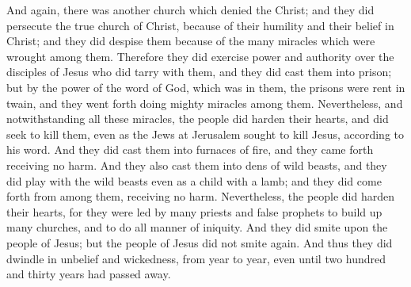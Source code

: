 And again, there was another church which denied the Christ; and they did persecute the true church of Christ, because of their humility and their belief in Christ; and they did despise them because of the many miracles which were wrought among them.
\bverse \iffalse Therefore they did exercise power and authority over the disciples of Jesus who did tarry with them, and they did cast them into prison; but by the power of the word of God, which was in them, the prisons were rent in twain, and they went forth doing mighty miracles among them. \fi
Therefore they did exercise power and authority over the disciples of Jesus who did tarry with them, and they did cast them into prison; but by the power of the word of God, which was in them, the prisons were rent in twain, and they went forth doing mighty miracles among them.
\bverse \iffalse Nevertheless, and notwithstanding all these miracles, the people did harden their hearts, and did seek to kill them, even as the Jews at Jerusalem sought to kill Jesus, according to his word. \fi
Nevertheless, and notwithstanding all these miracles, the people did harden their hearts, and did seek to kill them, even as the Jews at Jerusalem sought to kill Jesus, according to his word.
\bverse \iffalse And they did cast them into furnaces of fire, and they came forth receiving no harm. \fi
And they did cast them into furnaces of fire, and they came forth receiving no harm.
\bverse \iffalse And they also cast them into dens of wild beasts, and they did play with the wild beasts even as a child with a lamb; and they did come forth from among them, receiving no harm. \fi
And they also cast them into dens of wild beasts, and they did play with the wild beasts even as a child with a lamb; and they did come forth from among them, receiving no harm.
\bverse \iffalse Nevertheless, the people did harden their hearts, for they were led by many priests and false prophets to build up many churches, and to do all manner of iniquity. And they did smite upon the people of Jesus; but the people of Jesus did not smite again. And thus they did dwindle in unbelief and wickedness, from year to year, even until two hundred and thirty years had passed away. \fi
Nevertheless, the people did harden their hearts, for they were led by many priests and false prophets to build up many churches, and to do all manner of iniquity. And they did smite upon the people of Jesus; but the people of Jesus did not smite again. And thus they did dwindle in unbelief and wickedness, from year to year, even until two hundred and thirty years had passed away.
